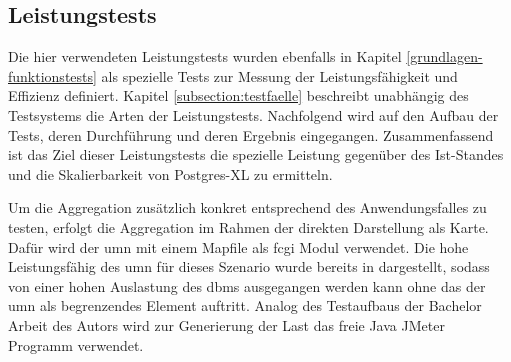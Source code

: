 
\subsection{Leistungstests}
Die hier verwendeten Leistungstests wurden ebenfalls in Kapitel \ref{grundlagen-funktionstests} als spezielle Tests zur Messung der Leistungsfähigkeit und Effizienz definiert.
Kapitel \ref{subsection:testfaelle} beschreibt unabhängig des Testsystems die Arten der Leistungstests.
Nachfolgend wird auf den Aufbau der Tests, deren Durchführung und deren Ergebnis eingegangen.
Zusammenfassend ist das Ziel dieser Leistungstests die spezielle Leistung gegenüber des Ist-Standes und die Skalierbarkeit von Postgres-XL zu ermitteln.

Um die Aggregation zusätzlich konkret entsprechend des Anwendungsfalles zu testen, erfolgt die Aggregation im Rahmen der direkten Darstellung als Karte.
Dafür wird der \Gls{umn} mit einem Mapfile als \Gls{fcgi} Modul verwendet.
Die hohe Leistungsfähig des \Gls{umn} für dieses Szenario wurde bereits in \cite{ba:kurt} dargestellt, sodass von einer hohen Auslastung des \Gls{dbms} ausgegangen werden kann ohne das der \Gls{umn} als begrenzendes Element auftritt.
Analog des Testaufbaus der Bachelor Arbeit des Autors wird zur Generierung der Last das freie Java JMeter Programm verwendet.



